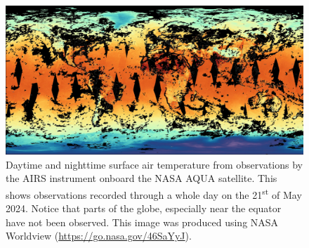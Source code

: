 \begin{figure}[ht] %
    \centering
    \includegraphics[width=1.0\linewidth]{figures/snapshot_nasa_airs_aqua_2024_05_21T00_00_00Z.jpg}
    \caption{Daytime and nighttime surface air temperature from observations by the AIRS instrument onboard the NASA AQUA satellite. This shows observations recorded through a whole day on the 21\textsuperscript{st} of May 2024. Notice that parts of the globe, especially near the equator have not been observed. This image was produced using NASA Worldview (\url{https://go.nasa.gov/46SaYyJ}).}\label{fig:satellite_image_coverage}
\end{figure}

